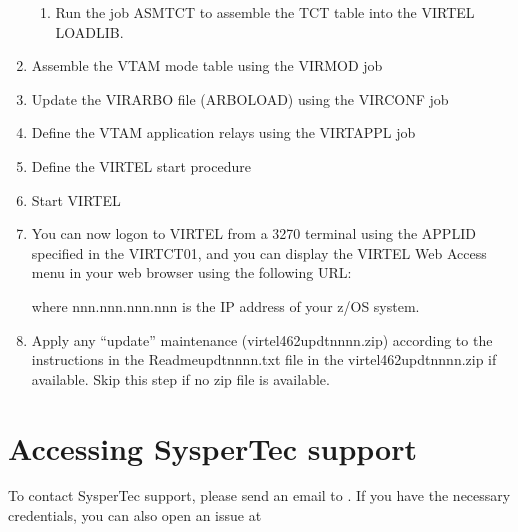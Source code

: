 \documentclass[letterpaper,10pt,english]{sphinxmanual}
\begin{document}
\begin{enumerate}
\begin{enumerate}
\item {} 
\sphinxAtStartPar
Run the job ASMTCT  to assemble the TCT table into the VIRTEL LOADLIB.

\end{enumerate}

\item {} 
\sphinxAtStartPar
Assemble the VTAM mode table using the VIRMOD job

\item {} 
\sphinxAtStartPar
Update the VIRARBO file (ARBOLOAD) using the VIRCONF job

\item {} 
\sphinxAtStartPar
Define the VTAM application relays using the VIRTAPPL job

\item {} 
\sphinxAtStartPar
Define the VIRTEL start procedure

\item {} 
\sphinxAtStartPar
Start VIRTEL

\item {} 
\sphinxAtStartPar
You can now logon to VIRTEL from a 3270 terminal using the APPLID specified in the VIRTCT01, and you can display the VIRTEL Web Access menu in your web browser using the following URL:
\begin{quote}

\sphinxAtStartPar
{}
\end{quote}

\sphinxAtStartPar
where nnn.nnn.nnn.nnn is the IP address of your z/OS system.

\item {} 
\sphinxAtStartPar
Apply any “update” maintenance (virtel462updtnnnn.zip) according to the instructions in the Readme\sphinxhyphen{}updtnnnn.txt file in the virtel462updtnnnn.zip if available. Skip this step if no zip file is available.

\end{enumerate}


\section{Accessing SysperTec support}
\label{\detokenize{Getting_Started:accessing-syspertec-support}}
\sphinxAtStartPar
To contact SysperTec support, please send an email to . If you have the necessary credentials, you can also open an issue at 
\end{document}
